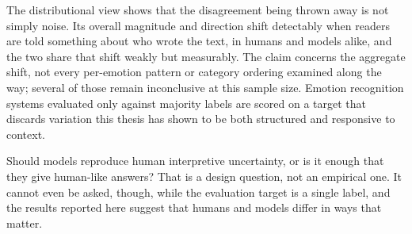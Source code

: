 The distributional view shows that the disagreement being thrown away is not simply noise. Its
overall magnitude and direction shift detectably when readers are told something about who wrote
the text, in humans and models alike, and the two share that shift weakly but measurably. The
claim concerns the aggregate shift, not every per-emotion pattern or category ordering examined
along the way; several of those remain inconclusive at this sample size. Emotion recognition
systems evaluated only against majority labels are scored on a target that discards variation this
thesis has shown to be both structured and responsive to context.

Should models reproduce human interpretive uncertainty, or is it enough that they give human-like
answers? That is a design question, not an empirical one. It cannot even be asked, though, while
the evaluation target is a single label, and the results reported here suggest that humans and
models differ in ways that matter.
